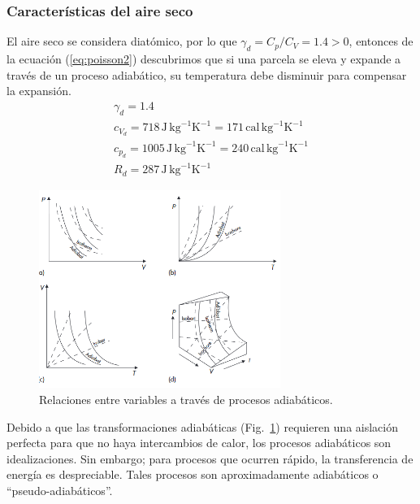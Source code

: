 \documentclass[openany]{book}
\begin{document}
\subsubsection{Características del aire seco}
El aire seco se considera diatómico, por lo que $\gamma_d=C_p/C_V=1.4>0$, entonces de la ecuación (\ref{eq:poisson2}) descubrimos que si una parcela se eleva y expande a través de un proceso adiabático, su temperatura debe disminuir para compensar la expansión.
\begin{gather*}
	\gamma_d=1.4\\
	c_{V_d}=718\,\mathrm{J\,kg}^{-1}\mathrm{K}^{-1}=171\,\mathrm{cal\,kg}^{-1}\mathrm{K}^{-1}\\
	c_{p_d}=1005\,\mathrm{J\,kg}^{-1}\mathrm{K}^{-1}=240\,\mathrm{cal\,kg}^{-1}\mathrm{K}^{-1}\\
	R_d=287\,\mathrm{J\,kg}^{-1}\mathrm{K}^{-1}
\end{gather*}
\begin{figure}[hbt!]
	\centering
	\includegraphics[width=0.7\textwidth]{img/procesos-adiabaticos.png}
	\caption{Relaciones entre variables a través de procesos adiabáticos.}
	\label{fig:rel-adiabaticas}
\end{figure}

\par Debido a que las transformaciones adiabáticas (Fig.\ \ref{fig:rel-adiabaticas}) requieren una aislación perfecta para que no haya intercambios de calor, los procesos adiabáticos son idealizaciones. Sin embargo; para procesos que ocurren rápido, la transferencia de energía es despreciable. Tales procesos son aproximadamente adiabáticos o ``pseudo-adiabáticos''.
\end{document}
